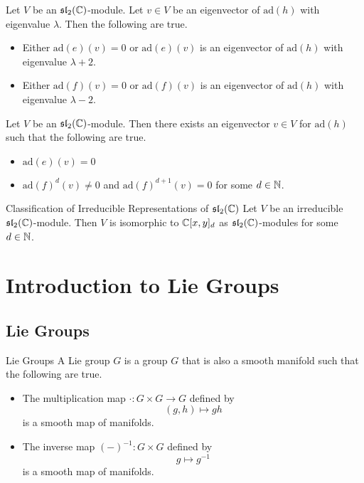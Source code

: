 \documentclass[a4paper]{article}
\begin{document}
\begin{lmm}{}{} Let $V$ be an $\mathfrak{sl}_2(\mathbb{C})$-module. Let $v\in V$ be an eigenvector of $\text{ad}(h)$ with eigenvalue $\lambda$. Then the following are true. 
\begin{itemize}
\item Either $\text{ad}(e)(v)=0$ or $\text{ad}(e)(v)$ is an eigenvector of $\text{ad}(h)$ with eigenvalue $\lambda+2$. 
\item Either $\text{ad}(f)(v)=0$ or $\text{ad}(f)(v)$ is an eigenvector of $\text{ad}(h)$ with eigenvalue $\lambda-2$. 
\end{itemize}
\end{lmm}

\begin{lmm}{}{} Let $V$ be an $\mathfrak{sl}_2(\mathbb{C})$-module. Then there exists an eigenvector $v\in V$ for $\text{ad}(h)$ such that the following are true. 
\begin{itemize}
\item $\text{ad}(e)(v)=0$
\item $\text{ad}(f)^d(v)\neq 0$ and $\text{ad}(f)^{d+1}(v)=0$ for some $d\in\mathbb{N}$. 
\end{itemize}
\end{lmm}

\begin{thm}{Classification of Irreducible Representations of $\mathfrak{sl}_2(\mathbb{C})$}{} Let $V$ be an irreducible $\mathfrak{sl}_2(\mathbb{C})$-module. Then $V$ is isomorphic to $\mathbb{C}[x,y]_d$ as $\mathfrak{sl}_2(\mathbb{C})$-modules for some $d\in\mathbb{N}$. 
\end{thm}

\pagebreak
\section{Introduction to Lie Groups}
\subsection{Lie Groups}
\begin{defn}{Lie Groups}{} A Lie group $G$ is a group $G$ that is also a smooth manifold such that the following are true. 
\begin{itemize}
\item The multiplication map $\cdot:G\times G\to G$ defined by $$(g,h)\mapsto gh$$ is a smooth map of manifolds. 
\item The inverse map $(-)^{-1}:G\times G$ defined by $$g\mapsto g^{-1}$$ is a smooth map of manifolds. 
\end{itemize}
\end{defn}
\end{document}
